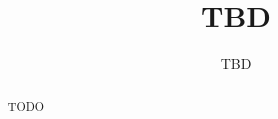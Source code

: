 \documentclass[10pt,twocolumn,letterpaper]{article}
\author{
TBD
}
\title{
TBD
}
\date{}
\begin{document}
\maketitle

\begin{abstract}
\small
TODO
\end{abstract}







\end{document}
